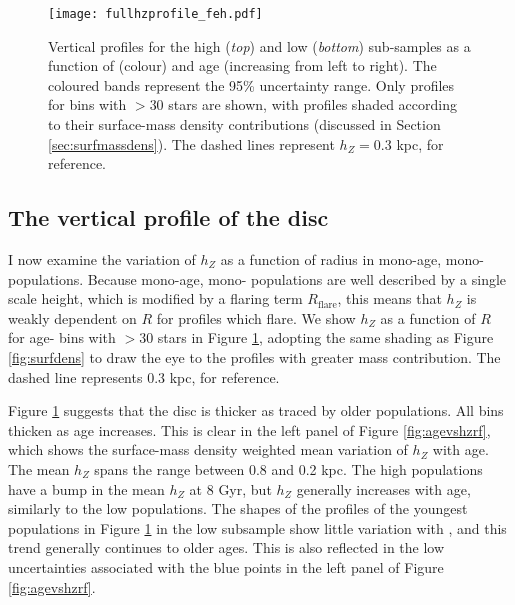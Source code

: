 \begin{landscape}
 \begin{figure}
 	\texttt{[image: fullhzprofile\_feh.pdf]}
 	\centering
     \caption[Radial scale height profiles of mono-age, mono-\feh{} populations in the low and high \afe{} disc components]{Vertical profiles for the high \afe{} (\emph{top}) and low \afe{} (\emph{bottom}) sub-samples as a function of \feh{} (colour) and age (increasing from left to right). The coloured bands represent the 95\% uncertainty range. Only profiles for bins with $> 30$ stars are shown, with profiles shaded according to their surface-mass density contributions (discussed in Section \ref{sec:surfmassdens}).  The dashed lines represent $h_Z = 0.3$ kpc, for reference.}
     \label{fig:hzprofile}
 \end{figure}
\end{landscape}


\subsection{The vertical profile of the disc}
I now examine the variation of $h_Z$ as a function of radius in mono-age, mono-\feh{} populations. Because mono-age, mono-\feh{} populations are well described by a single scale height, which is modified by a flaring term $R_{\text{flare}}$, this means that $h_Z$ is weakly dependent on $R$ for profiles which flare. We show $h_Z$ as a function of $R$ for age-\feh{} bins with $> 30$ stars in Figure \ref{fig:hzprofile}, adopting the same shading as Figure \ref{fig:surfdens} to draw the eye to the profiles with greater mass contribution. The dashed line represents $0.3$ kpc, for reference.

Figure \ref{fig:hzprofile} suggests that the disc is thicker as traced by older populations. All \feh{} bins thicken as age increases. This is clear in the left panel of Figure \ref{fig:agevshzrf}, which shows the surface-mass density weighted mean variation of $h_Z$ with age. The mean $h_Z$ spans the range between 0.8 and 0.2 kpc. The high \afe{} populations have  a bump in the mean $h_Z$ at 8 Gyr, but $h_Z$ generally increases with age, similarly to the low \afe{} populations. The shapes of the profiles of the youngest populations in Figure \ref{fig:hzprofile} in the low \afe{} subsample show little variation with \feh{}, and this trend generally continues to older ages. This is also reflected in the low uncertainties associated with the blue points in the left panel of Figure \ref{fig:agevshzrf}. 

